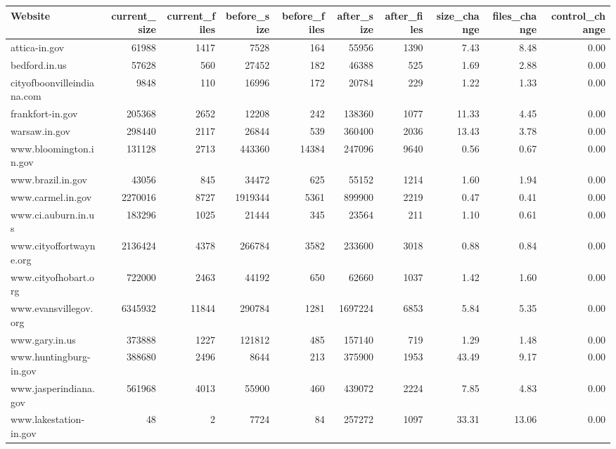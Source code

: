 \documentclass[11pt]{article}
\begin{document}
\begin{landscape}
\begin{table}[ht]
	\centering
	\footnotesize
	\begin{tabular}{lrrrrrrrrr}
		\hline
		Website & current\_size & current\_files & before\_size & before\_files & after\_size & after\_files & size\_change & files\_change & control\_change \\ 
		\hline
		attica-in.gov & 61988 & 1417 & 7528 & 164 & 55956 & 1390 & 7.43 & 8.48 & 0.00 \\ 
		bedford.in.us & 57628 & 560 & 27452 & 182 & 46388 & 525 & 1.69 & 2.88 & 0.00 \\ 
		cityofboonvilleindiana.com & 9848 & 110 & 16996 & 172 & 20784 & 229 & 1.22 & 1.33 & 0.00 \\ 
		frankfort-in.gov & 205368 & 2652 & 12208 & 242 & 138360 & 1077 & 11.33 & 4.45 & 0.00 \\ 
		warsaw.in.gov & 298440 & 2117 & 26844 & 539 & 360400 & 2036 & 13.43 & 3.78 & 0.00 \\ 
		www.bloomington.in.gov & 131128 & 2713 & 443360 & 14384 & 247096 & 9640 & 0.56 & 0.67 & 0.00 \\ 
		www.brazil.in.gov & 43056 & 845 & 34472 & 625 & 55152 & 1214 & 1.60 & 1.94 & 0.00 \\ 
		www.carmel.in.gov & 2270016 & 8727 & 1919344 & 5361 & 899900 & 2219 & 0.47 & 0.41 & 0.00 \\ 
		www.ci.auburn.in.us & 183296 & 1025 & 21444 & 345 & 23564 & 211 & 1.10 & 0.61 & 0.00 \\ 
		www.cityoffortwayne.org & 2136424 & 4378 & 266784 & 3582 & 233600 & 3018 & 0.88 & 0.84 & 0.00 \\ 
		www.cityofhobart.org & 722000 & 2463 & 44192 & 650 & 62660 & 1037 & 1.42 & 1.60 & 0.00 \\ 
		www.evansvillegov.org & 6345932 & 11844 & 290784 & 1281 & 1697224 & 6853 & 5.84 & 5.35 & 0.00 \\ 
		www.gary.in.us & 373888 & 1227 & 121812 & 485 & 157140 & 719 & 1.29 & 1.48 & 0.00 \\ 
		www.huntingburg-in.gov & 388680 & 2496 & 8644 & 213 & 375900 & 1953 & 43.49 & 9.17 & 0.00 \\ 
		www.jasperindiana.gov & 561968 & 4013 & 55900 & 460 & 439072 & 2224 & 7.85 & 4.83 & 0.00 \\ 
		www.lakestation-in.gov &  48 &   2 & 7724 &  84 & 257272 & 1097 & 33.31 & 13.06 & 0.00 \\ 

\end{tabular}
\end{table}
\end{landscape}
\end{document}
